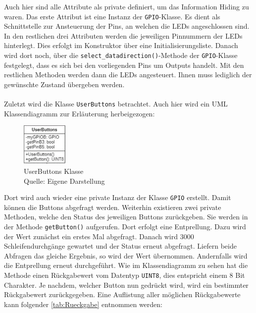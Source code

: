 Auch hier sind alle Attribute als private definiert, um das Information Hiding zu waren. Das erste Attribut ist eine Instanz der \texttt{GPIO}-Klasse. Es dient als Schnittstelle zur Ansteuerung der Pins, an welchen die LEDs angeschlossen sind. In den restlichen drei Attributen werden die jeweiligen Pinnummern der LEDs hinterlegt. Dies erfolgt im Konstruktor über eine Initialisierungsliste. Danach wird dort noch, über die \texttt{select\_datadirection()}-Methode der \texttt{GPIO}-Klasse festgelegt, dass es sich bei den vorliegenden Pins um Outputs handelt. Mit den restlichen Methoden werden dann die LEDs angesteuert. Ihnen muss lediglich der gewünschte Zustand übergeben werden.\\
\\
Zuletzt wird die Klasse \texttt{UserButtons} betrachtet. Auch hier wird ein UML Klassendiagramm zur Erläuterung herbeigezogen:\\

\begin{figure}[H] 
	\centering
	\includegraphics[width=0.2\textwidth]{images/06.png}
	\caption{UserButtons Klasse \protect \\ Quelle: Eigene Darstellung }
	\label{fig:grafi6}
\end{figure}

Dort wird auch wieder eine private Instanz der Klasse \texttt{GPIO} erstellt. Damit können die Buttons abgefragt werden. Weiterhin existieren zwei private Methoden, welche den Status des jeweiligen Buttons zurückgeben. Sie werden in der Methode \texttt{getButton()} aufgerufen. Dort erfolgt eine Entprellung. Dazu wird der Wert zunächst ein erstes Mal abgefragt. Danach wird 3000 Schleifendurchgänge gewartet und der Status erneut abgefragt. Liefern beide Abfragen das gleiche Ergebnis, so wird der Wert übernommen. Andernfalls wird die Entprellung erneut durchgeführt. Wie im Klassendiagramm zu sehen hat die Methode einen Rückgabewert vom Datentyp \texttt{UINT8}, dies entspricht einem 8 Bit Charakter. Je nachdem, welcher Button nun gedrückt wird, wird ein bestimmter Rückgabewert zurückgegeben. Eine Auflistung aller möglichen Rückgabewerte kann folgender \autoref{tab:Rueckgabe} entnommen werden:\\

